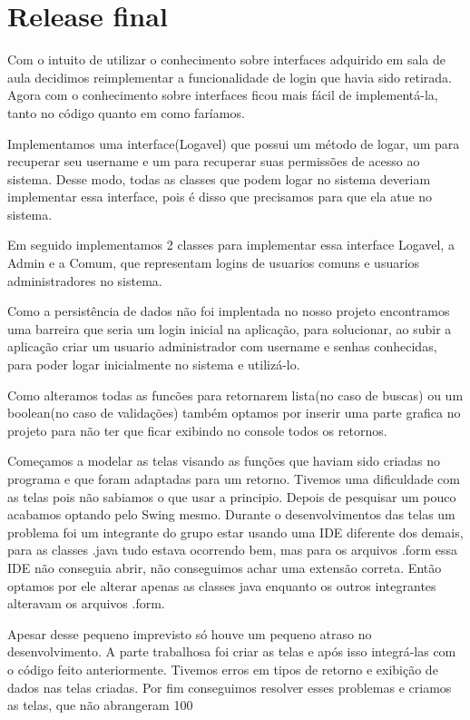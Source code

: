 \documentclass[11pt,twoside]{article}
\begin{document}
\section{Release final}
{\color{red}
Com o intuito de utilizar o conhecimento sobre interfaces adquirido em sala de aula decidimos reimplementar a funcionalidade de login que havia sido retirada. Agora com o conhecimento sobre interfaces ficou mais fácil de implementá-la, tanto no código quanto em como faríamos.

Implementamos uma interface(Logavel) que possui um método de logar, um para recuperar seu username e um para recuperar suas permissões de acesso ao sistema. Desse modo, todas as classes que podem logar no sistema deveriam implementar essa interface, pois é disso que precisamos para que ela atue no sistema.

Em seguido implementamos 2 classes para implementar essa interface Logavel, a Admin e a Comum, que representam logins de usuarios comuns e usuarios administradores no sistema.

Como a persistência de dados não foi implentada no nosso projeto encontramos uma barreira que seria um login inicial na aplicação, para solucionar, ao subir a aplicação criar um usuario administrador com username e senhas conhecidas, para poder logar inicialmente no sistema e utilizá-lo.

Como alteramos todas as funcões para retornarem lista(no caso de buscas) ou um boolean(no caso de validações) também optamos por inserir uma parte grafica no projeto para não ter que ficar exibindo no console todos os retornos. 

Começamos a modelar as telas visando as funções que haviam sido criadas no programa e que foram adaptadas para um retorno. Tivemos uma dificuldade com as telas pois não sabiamos o que usar a principio. Depois de pesquisar um pouco acabamos optando pelo Swing mesmo. Durante o desenvolvimentos das telas um problema foi um integrante do grupo estar usando uma IDE diferente dos demais, para as classes .java tudo estava ocorrendo bem, mas para os arquivos .form essa IDE não conseguia abrir, não conseguimos achar uma extensão correta. Então optamos por ele alterar apenas as classes java enquanto os outros integrantes alteravam os arquivos .form.

Apesar desse pequeno imprevisto só houve um pequeno atraso no desenvolvimento. A parte trabalhosa foi criar as telas e após isso integrá-las com o código feito anteriormente. Tivemos erros em tipos de retorno e exibição de dados nas telas criadas. Por fim conseguimos resolver esses problemas e criamos as telas, que não abrangeram 100%

}
\end{document}

